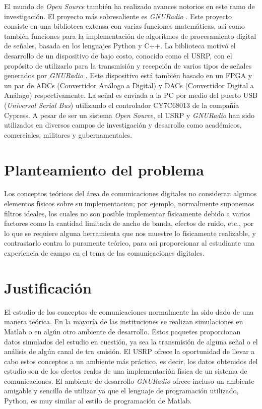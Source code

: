 El mundo de \emph{Open Source} tambi\'en ha realizado avances notorios en este ramo de investigaci\'on. El proyecto m\'as
sobresaliente es \emph{GNURadio} \cite{radio}. Este proyecto consiste en una biblioteca extensa con varias funciones
matem\'aticas, as\'i como tambi\'en funciones para la implementaci\'on de algoritmos de procesamiento digital de se\~nales,
basada en los lenguajes Python y C++. La biblioteca motiv\'o el desarrollo de un dispositivo de bajo costo, conocido
como el USRP, con el prop\'osito de utilizarlo para la transmisi\'on y recepci\'on de varios tipos de se\~nales generados
por \emph{GNURadio} \cite{ettus}. Este dispositivo est\'a tambi\'en basado en un FPGA y un par de ADCs (Convertidor
An\'alogo a Digital) y DACs (Convertidor Digital a An\'alago) respectivamente. La se\~nal es enviada a la PC por medio del puerto USB
(\emph{Universal Serial Bus}) utilizando el controlador CY7C68013 de la compa\~n\'ia Cypress. A pesar de ser un sistema
\emph{Open Source}, el USRP y \emph{GNURadio} han sido utilizados en diversos campos de investigaci\'on y desarrollo como
acad\'emicos, comerciales, militares y gubernamentales.

\section{Planteamiento del problema}
Los conceptos te\'oricos del \'area de comunicaciones digitales no consideran algunos elementos f\'isicos sobre su
implementacion; por ejemplo, normalmente suponemos filtros ideales, los cuales no son posible implementar f\'isicamente
debido a varios factores como la cantidad limitada de ancho de banda, efectos de ruido, etc., por lo que se requiere alguna
herramienta que nos muestre lo f\'isicamente realizable, y contrastarlo contra lo puramente te\'orico, para asi proporcionar
al estudiante una experiencia de campo en el tema de las comunicaciones digitales.

\section{Justificaci\'on}

El estudio de los conceptos de comunicaciones normalmente ha sido dado de una manera te\'orica. En la mayor\'ia de las
instituciones se realizan simulaciones en Matlab o en alg\'un otro ambiente de desarrollo. Estos paquetes proporcionan datos
simulados del estudio en cuesti\'on, ya sea la transmisi\'on de alguna se\~nal o el an\'alisis de alg\'un canal de tra
smisi\'on. El USRP ofrece la oportunidad de llevar a cabo estos conceptos a un ambiente m\'as pr\'actico, es decir, los
datos obtenidos del estudio son de los efectos reales de una implementaci\'on f\'isica de un sistema de comunicaciones. El
ambiente de desarrollo \emph{GNURadio} ofrece incluso un ambiente amigable y sencillo de utilizar ya que el lenguaje de
programaci\'on utilizado, Python, es muy similar al estilo de programaci\'on de Matlab.

